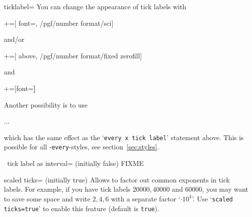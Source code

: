 \begin{pgfplotsxykey}{\x ticklabel=}
You can change the appearance of tick labels with
\begin{codeexample}
+=[
	font=\tiny,
	/pgf/number format/sci]
\end{codeexample}
and/or
\begin{codeexample}
+=[
	above,
	/pgf/number format/fixed zerofill]
\end{codeexample}
and
\begin{codeexample}
+=[font=\bfseries]
\end{codeexample}
Another possibility is to use 
\begin{codeexample}
\begin{axis}[y tick label style={above,
	/pgf/number format/fixed zerofill}
]
...
\end{axis}
\end{codeexample}
which has the same effect as the `\texttt{every x tick label}' statement above. This is possible for all \PGFPlots-\texttt{every}-styles, see section~\ref{sec:styles}.
\end{pgfplotsxykey}

\begin{pgfplotsxykey}{\x\ tick label as interval= (initially false)}
	FIXME
\end{pgfplotsxykey}

\label{sec:scaled:ticks}%
\begin{pgfplotskey}{scaled ticks= (initially true)}
Allows to factor out common exponents in tick labels. For example, if you have tick labels $20000,40000$ and $60000$, you may want to save some space and write $2,4,6$ with a separate factor `$\cdot 10^4$'. Use `\texttt{scaled ticks=true}' to enable this feature (default is \texttt{true}).

\begin{codeexample}[]
%
\end{codeexample}

\begin{codeexample}[]
\end{codeexample}
\end{pgfplotskey}

